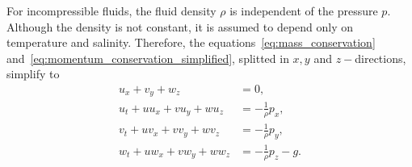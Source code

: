 For incompressible fluids, the fluid density $\rho$ is independent of the pressure $p$.
Although the density is not constant, it is assumed to depend only on temperature and salinity.
Therefore, the equations~\eqref{eq:mass_conservation} and~\eqref{eq:momentum_conservation_simplified}, splitted in $x, y$ and $z-$directions, simplify to 
\begin{align}
    u_x + v_y + w_z &= 0 , \label{eq:mass_conservation_incompressible} \\
    u_t + u u_x + v u_y + w u_z &= - \frac{1}{\rho} p_x , \label{eq:momentum_conservation_x} \\
    v_t + u v_x + v v_y + w v_z &= - \frac{1}{\rho} p_y , \label{eq:momentum_conservation_y} \\
    w_t + u w_x + v w_y + w w_z &= - \frac{1}{\rho} p_z - g. \label{eq:momentum_conservation_z}
\end{align}


